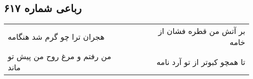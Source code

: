 \begin{center}
\section*{رباعی شماره ۶۱۷}
\label{sec:sh617}
\begin{longtable}{l p{0.5cm} r}
هجران ترا چو گرم شد هنگامه
&&
بر آتش من قطره فشان از خامه
\\
من رفتم و مرغ روح من پیش تو ماند
&&
تا همچو کبوتر از تو آرد نامه
\\
\end{longtable}
\end{center}
